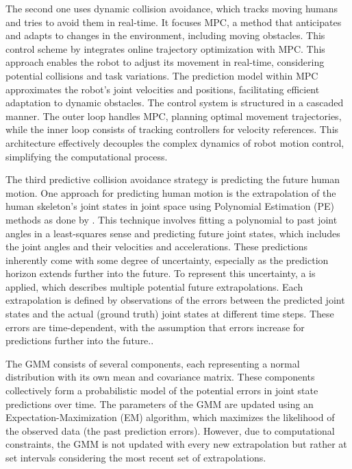 The second one uses dynamic collision avoidance, which tracks moving humans and tries to avoid them in real-time. It focuses \gls{MPC}, a method that anticipates and adapts to changes in the environment, including moving obstacles.
This control scheme by \textcite{max} integrates online trajectory optimization with MPC. This approach enables the robot to adjust its movement in real-time, considering potential collisions and task variations. The prediction model within MPC approximates the robot's joint velocities and positions, facilitating efficient adaptation to dynamic obstacles.
The control system is structured in a cascaded manner. The outer loop handles MPC, planning optimal movement trajectories, while the inner loop consists of tracking controllers for velocity references. This architecture effectively decouples the complex dynamics of robot motion control, simplifying the computational process.\parencite{max}

The third predictive collision avoidance strategy is predicting the future human motion. One approach for predicting human motion is the extrapolation of the human skeleton's joint states in joint space using Polynomial Estimation (PE) methods as done by \textcite{renz1}. This technique involves fitting a polynomial to past joint angles in a least-squares sense and predicting future joint states, which includes the joint angles and their velocities and accelerations. These predictions inherently come with some degree of uncertainty, especially as the prediction horizon extends further into the future.
To represent this uncertainty, a  is applied, which describes multiple potential future extrapolations. Each extrapolation is defined by observations of the errors between the predicted joint states and the actual (ground truth) joint states at different time steps. These errors are time-dependent, with the assumption that errors increase for predictions further into the future.\parencite{renz2}.

The GMM consists of several components, each representing a normal distribution with its own mean and covariance matrix. These components collectively form a probabilistic model of the potential errors in joint state predictions over time. The parameters of the GMM are updated using an Expectation-Maximization (EM) algorithm, which maximizes the likelihood of the observed data (the past prediction errors). However, due to computational constraints, the GMM is not updated with every new extrapolation but rather at set intervals considering the most recent set of extrapolations.

